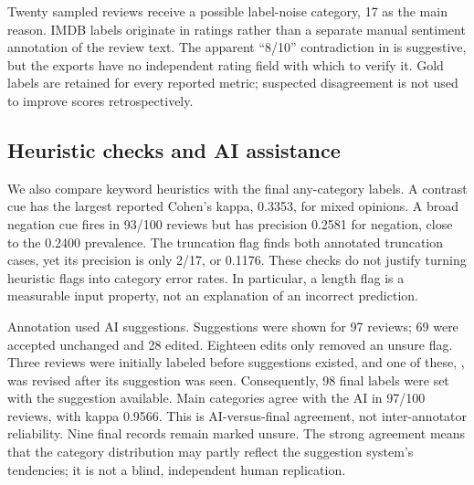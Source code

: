 Twenty sampled reviews receive a possible label-noise category, 17 as the main
reason. IMDB labels originate in ratings rather than a separate manual sentiment
annotation of the review text. The apparent ``8/10'' contradiction in
 is suggestive, but the exports have no independent rating
field with which to verify it. Gold labels are retained for every reported
metric; suspected disagreement is not used to improve scores retrospectively.

\subsection{Heuristic checks and AI assistance}
We also compare keyword heuristics with the final
any-category labels. A contrast cue has the largest reported Cohen's kappa,
0.3353, for mixed opinions. A broad negation cue fires in 93/100 reviews but
has precision 0.2581 for negation, close to the 0.2400 prevalence. The truncation
flag finds both annotated truncation cases, yet its precision is only 2/17,
or 0.1176. These checks do not justify turning heuristic flags into category
error rates. In particular, a length flag is a measurable input property,
not an explanation of an incorrect prediction.

Annotation used AI suggestions. Suggestions were shown for 97 reviews; 69
were accepted unchanged and 28 edited. Eighteen edits only removed an unsure
flag. Three reviews were initially labeled before suggestions existed, and
one of these, , was revised after its suggestion was seen.
Consequently, 98 final labels were set with the suggestion available. Main
categories agree with the AI in 97/100 reviews, with kappa 0.9566. This is
AI-versus-final agreement, not inter-annotator reliability. Nine final records
remain marked unsure. The strong agreement means that the category distribution
may partly reflect the suggestion system's tendencies; it is not a blind,
independent human replication.

